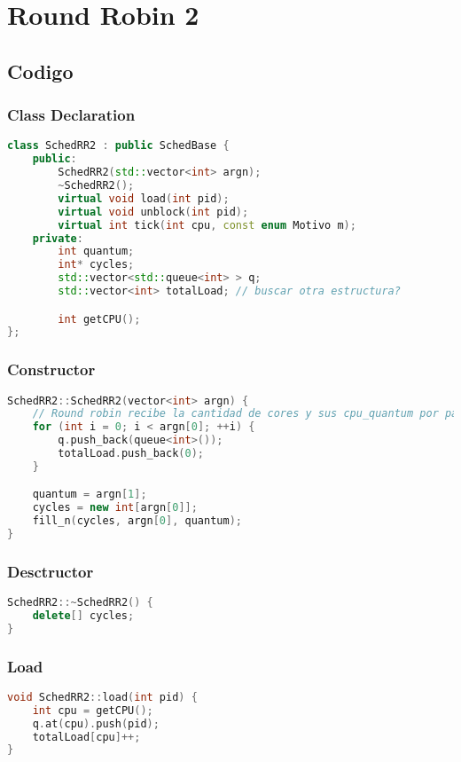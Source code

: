 \section{Round Robin 2}

\subsection{Codigo}

\subsubsection{Class Declaration}
\begin{lstlisting}[language=C++, breaklines=true]
class SchedRR2 : public SchedBase {
	public:
		SchedRR2(std::vector<int> argn);
        ~SchedRR2();
		virtual void load(int pid);
		virtual void unblock(int pid);
		virtual int tick(int cpu, const enum Motivo m);
	private:
		int quantum;
		int* cycles;
		std::vector<std::queue<int> > q;
		std::vector<int> totalLoad; // buscar otra estructura?

		int getCPU();
};
\end{lstlisting}

\subsubsection{Constructor}
\begin{lstlisting}[language=C++, breaklines=true]
SchedRR2::SchedRR2(vector<int> argn) {
	// Round robin recibe la cantidad de cores y sus cpu_quantum por parametro
	for (int i = 0; i < argn[0]; ++i) {
		q.push_back(queue<int>());
		totalLoad.push_back(0);
	}

	quantum = argn[1];
	cycles = new int[argn[0]];
	fill_n(cycles, argn[0], quantum);
}
\end{lstlisting}

\subsubsection{Desctructor}
\begin{lstlisting}[language=C++, breaklines=true]
SchedRR2::~SchedRR2() {
	delete[] cycles;
}
\end{lstlisting}

\subsubsection{Load}
\begin{lstlisting}[language=C++, breaklines=true]
void SchedRR2::load(int pid) {
	int cpu = getCPU();
	q.at(cpu).push(pid);
	totalLoad[cpu]++;
}
\end{lstlisting}

